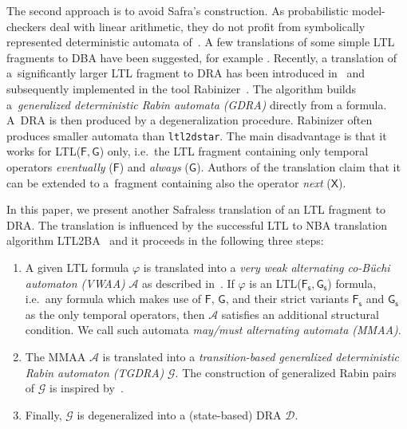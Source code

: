 \documentclass{llncs}
\newcommand{\X}{\mathsf{X}}     \newcommand{\U}{{\,\uU\,}}      \newcommand{\uU}{\mathsf{U}}    \newcommand{\rR}{\mathsf{R}}    \newcommand{\R}{{\,\rR\,}}      \newcommand{\F}{\mathsf{F}}     \newcommand{\G}{\mathsf{G}}     \newcommand{\Fs}{{\F\!\s}}      \newcommand{\Gs}{{\G\s}}        \newcommand{\s}{_\mathsf{s}}
\newcommand{\mA}{\mathcal{A}}
\newcommand{\mD}{\mathcal{D}}
\newcommand{\mG}{\mathcal{G}}
\begin{document}
The second approach is to avoid Safra's construction.
As probabilistic model-checkers deal with linear arithmetic, 
they do not profit 
from symbolically represented deterministic automata
of~\cite{PPS06,MorgensternS08}.
A few translations of some simple LTL fragments to DBA have been
suggested, for example \cite{AT04}.  
Recently, a translation of
a~significantly larger LTL fragment to DRA has been introduced
in~\cite{KE12} and subsequently implemented in the tool
Rabinizer~\cite{GKE12}. The algorithm builds a~\emph{generalized
  deterministic Rabin automata (GDRA)} directly from a formula. A~DRA is
then produced by a degeneralization procedure. Rabinizer often produces
smaller automata than \texttt{ltl2dstar}. The main disadvantage is that
it works for LTL($\F,\G$) only, i.e.~the LTL fragment containing only
temporal operators \emph{eventually} ($\F$) and \emph{always}
($\G$). Authors of the translation claim that it can be extended to
a~fragment containing also the operator \emph{next} ($\X$).

In this paper, we present another Safraless translation of an LTL
fragment to DRA. 
The translation is influenced by the successful LTL
to NBA translation algorithm LTL2BA~\cite{GO01}
and it proceeds in the following three steps:
\begin{enumerate}
\item A given LTL formula $\varphi$ is translated into a \emph{very weak
    alternating co-B\"uchi automaton (VWAA)} $\mA$ as described
  in~\cite{GO01}. If $\varphi$ is an LTL($\Fs,\Gs$) formula, i.e.~any
  formula which makes use of $\F$, $\G$, and their strict variants $\Fs$ and
  $\Gs$ as the only temporal operators,
then $\mA$ satisfies an additional structural condition. We call such
  automata \emph{may/must alternating automata (MMAA)}.
\item The MMAA $\mA$ is translated into a \emph{transition-based
    generalized deterministic Rabin automaton (TGDRA)} $\mG$.  The
  construction of generalized Rabin pairs of $\mG$ is inspired
  by~\cite{KE12}.
\item Finally, $\mG$ is degeneralized into a (state-based) DRA $\mD$.  \end{enumerate}
\end{document}
